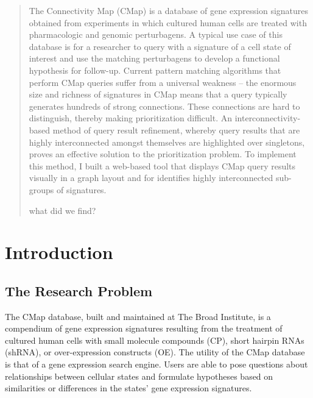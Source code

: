 \documentclass[12pt]{article}
\begin{document}

\begin{abstract}
The Connectivity Map (CMap) is a database of gene expression signatures obtained from experiments in which cultured human cells are treated with pharmacologic and genomic perturbagens. A typical use case of this database is for a researcher to query with a signature of a cell state of interest and use the matching perturbagens to develop a functional hypothesis for follow-up. Current pattern matching algorithms that perform CMap queries suffer from a universal weakness -- the enormous size and richness of signatures in CMap means that a query typically generates hundreds of strong connections. These connections are hard to distinguish, thereby making prioritization difficult. An interconnectivity-based method of query result refinement, whereby query results that are highly interconnected amongst themselves are highlighted over singletons, proves an effective solution to the prioritization problem. To implement this method, I built a web-based tool that displays CMap query results visually in a graph layout and for identifies highly interconnected sub-groups of signatures. 

what did we find?


\end{abstract}

\tableofcontents

\listoftables

\listoffigures

\doublespacing

\section{Introduction}

\subsection{The Research Problem}

The CMap database, built and maintained at The Broad Institute, is a compendium of gene expression signatures resulting from the treatment of cultured human cells with small molecule compounds (CP), short hairpin RNAs (shRNA), or over-expression constructs (OE). The utility of the CMap database is that of a gene expression search engine. Users are able to pose questions about relationships between cellular states and formulate hypotheses based on similarities or differences in the states' gene expression signatures.
\end{document}
